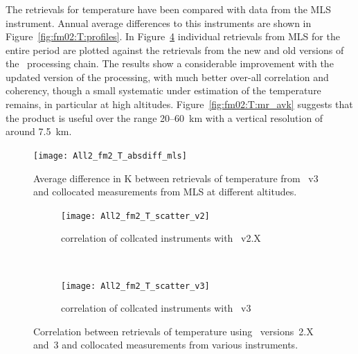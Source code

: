 
\subsubsection{}
\label{sec:fm02:comparison:temperature}
The retrievals for temperature have been compared with data from the MLS
instrument. Annual average differences to this instruments are shown in
Figure~\ref{fig:fm02:T:profiles}. In Figure~\ref{fig:fm02:T:scatter} individual
retrievals from MLS for the entire period are plotted against the
retrievals from the new and old versions of the \smr\ processing chain. The
results show a considerable improvement with the updated version of the
processing, with much better over-all correlation and coherency, though a
small systematic under estimation of the temperature remains, in particular at
high altitudes.
Figure~\ref{fig:fm02:T:mr_avk} suggests that the product is useful over the
range 20--60~km with a vertical resolution of around 7.5~km.

\begin{figure}[tbhp]
    \centering
    \texttt{[image: All2\_fm2\_T\_absdiff\_mls]}
    \caption{Average difference in K between retrievals of temperature from
    \smr~v3 and collocated measurements from MLS at different altitudes.}
    \label{fig:fm02:T:profiles}
    \label{fig:fm02:T:profiles:MLS}
\end{figure}

\begin{figure}[tbhp]
    \centering
    \begin{subfigure}[b]{0.49\textwidth}
        \texttt{[image: All2\_fm2\_T\_scatter\_v2]}
        \caption{correlation of collcated instruments with \smr~v2.X}
        \label{fig:fm02:T:scatter:v2}
    \end{subfigure}
    \,
    \begin{subfigure}[b]{0.49\textwidth}
        \texttt{[image: All2\_fm2\_T\_scatter\_v3]}
        \caption{correlation of collcated instruments with \smr~v3}
        \label{fig:fm02:T:scatter:v3}
    \end{subfigure}
    \caption{Correlation between retrievals of temperature using \smr\
    versions~2.X and~3 and collocated measurements from various instruments.}
    \label{fig:fm02:T:scatter}
\end{figure}

